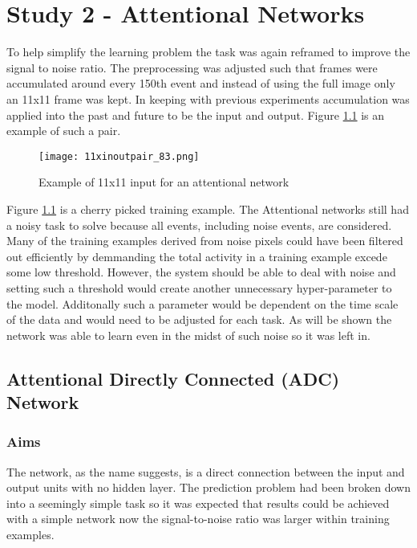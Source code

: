 \chapter{Study 2 - Attentional Networks}
\label{ch:attentional}
To help simplify the learning problem the task was again reframed to improve the signal to noise ratio.
The preprocessing was adjusted such that frames were accumulated around every 150th event and instead of using the full image only an 11x11 frame was kept.
In keeping with previous experiments accumulation was applied into the past and future to be the input and output. 
Figure \ref{fig:11inoutpair} is an example of such a pair.

\begin{figure}[h]
    \centering
    \texttt{[image: 11xinoutpair\_83.png]}
    \caption{Example of 11x11 input for an attentional network}
    \label{fig:11inoutpair}
\end{figure}

Figure \ref{fig:11inoutpair} is a cherry picked training example.
The Attentional networks still had a noisy task to solve because all events, including noise events, are considered. 
Many of the training examples derived from noise pixels could have been filtered out efficiently by demmanding the total activity in a training example excede some low threshold.
However, the system should be able to deal with noise and setting such a threshold would create another unnecessary hyper-parameter to the model.
Additonally such a parameter would be dependent on the time scale of the data and would need to be adjusted for each task. 
As will be shown the network was able to learn even in the midst of such noise so it was left in. 

\section{Attentional Directly Connected (ADC) Network}

\subsection{Aims}
The network, as the name suggests, is a direct connection between the input and output units with no hidden layer.
The prediction problem had been broken down into a seemingly simple task so it was expected that results could be achieved with a simple network now the signal-to-noise ratio was larger within training examples.

